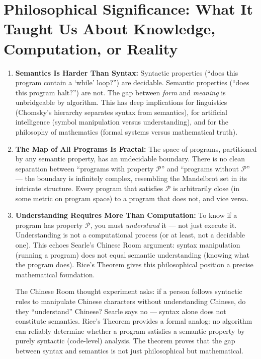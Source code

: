 \section{Philosophical Significance: What It Taught Us About Knowledge, Computation, or Reality}
\label{sec:rice:philosophy}

\begin{enumerate}
\item \textbf{Semantics Is Harder Than Syntax:} Syntactic properties (``does this program contain a `while' loop?'') are decidable. Semantic properties (``does this program halt?'') are not. The gap between \emph{form} and \emph{meaning} is unbridgeable by algorithm. This has deep implications for linguistics (Chomsky's hierarchy separates syntax from semantics), for artificial intelligence (symbol manipulation versus understanding), and for the philosophy of mathematics (formal systems versus mathematical truth).

\item \textbf{The Map of All Programs Is Fractal:} The space of programs, partitioned by any semantic property, has an undecidable boundary. There is no clean separation between ``programs with property $\mathcal{P}$'' and ``programs without $\mathcal{P}$'' --- the boundary is infinitely complex, resembling the Mandelbrot set in its intricate structure. Every program that satisfies $\mathcal{P}$ is arbitrarily close (in some metric on program space) to a program that does not, and vice versa.

\item \textbf{Understanding Requires More Than Computation:} To know if a program has property $\mathcal{P}$, you must \emph{understand} it --- not just execute it. Understanding is not a computational process (or at least, not a decidable one). This echoes Searle's Chinese Room argument: syntax manipulation (running a program) does not equal semantic understanding (knowing what the program does). Rice's Theorem gives this philosophical position a precise mathematical foundation.

The Chinese Room thought experiment asks: if a person follows syntactic rules to manipulate Chinese characters without understanding Chinese, do they ``understand'' Chinese? Searle says no --- syntax alone does not constitute semantics. Rice's Theorem provides a formal analog: no algorithm can reliably determine whether a program satisfies a semantic property by purely syntactic (code-level) analysis. The theorem proves that the gap between syntax and semantics is not just philosophical but mathematical.


\end{enumerate}
